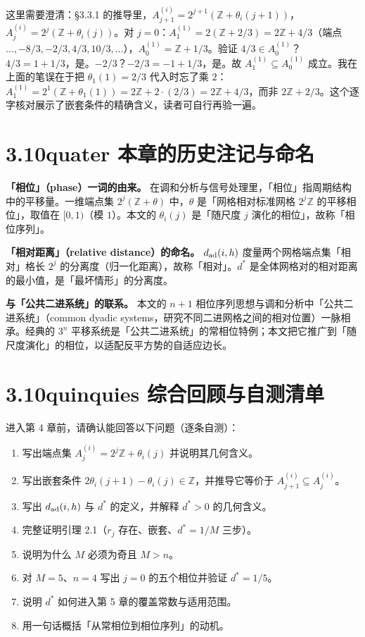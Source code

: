 \documentclass[a4paper,11pt,openany]{ctexbook}
\numberwithin{equation}{chapter}
\numberwithin{figure}{chapter}
\numberwithin{table}{chapter}
\begin{document}
这里需要澄清：§3.3.1 的推导里，$A_{j+1}^{(i)}=2^{j+1}(\mathbb Z+\theta_i(j+1))$，$A_j^{(i)}=2^j(\mathbb Z+\theta_i(j))$。对 $j=0$：$A_1^{(1)}=2(\mathbb Z+2/3)=2\mathbb Z+4/3$（端点 $\dots,-8/3,-2/3,4/3,10/3,\dots$），$A_0^{(1)}=\mathbb Z+1/3$。验证 $4/3\in A_0^{(1)}$？$4/3=1+1/3$，是。$-2/3$？$-2/3=-1+1/3$，是。故 $A_1^{(1)}\subseteq A_0^{(1)}$ 成立。我在上面的笔误在于把 $\theta_1(1)=2/3$ 代入时忘了乘 $2$：$A_1^{(1)}=2^1(\mathbb Z+\theta_1(1))=2\mathbb Z+2\cdot(2/3)=2\mathbb Z+4/3$，而非 $2\mathbb Z+2/3$。这个逐字核对展示了嵌套条件的精确含义，读者可自行再验一遍。

\section{3.10quater 本章的历史注记与命名}

\textbf{「相位」（phase）一词的由来。} 在调和分析与信号处理里，「相位」指周期结构中的平移量。一维端点集 $2^j(\mathbb Z+\theta)$ 中，$\theta$ 是「网格相对标准网格 $2^j\mathbb Z$ 的平移相位」，取值在 $[0,1)$（模 $1$）。本文的 $\theta_i(j)$ 是「随尺度 $j$ 演化的相位」，故称「相位序列」。

\textbf{「相对距离」（relative distance）的命名。} $d_{\rm ad}(i,h)$ 度量两个网格端点集「相对」格长 $2^j$ 的分离度（归一化距离），故称「相对」。$d^*$ 是全体网格对的相对距离的最小值，是「最坏情形」的分离度。

\textbf{与「公共二进系统」的联系。} 本文的 $n+1$ 相位序列思想与调和分析中「公共二进系统」（common dyadic systems，研究不同二进网格之间的相对位置）一脉相承。经典的 $3^n$ 平移系统是「公共二进系统」的常相位特例；本文把它推广到「随尺度演化」的相位，以适配反平方势的自适应边长。

\section{3.10quinquies 综合回顾与自测清单}

进入第 4 章前，请确认能回答以下问题（逐条自测）：

\begin{enumerate}
\item 写出端点集 $A_j^{(i)}=2^j\mathbb Z+\theta_i(j)$ 并说明其几何含义。
\item 写出嵌套条件 $2\theta_i(j+1)-\theta_i(j)\in\mathbb Z$，并推导它等价于 $A_{j+1}^{(i)}\subseteq A_j^{(i)}$。
\item 写出 $d_{\rm ad}(i,h)$ 与 $d^*$ 的定义，并解释 $d^*>0$ 的几何含义。
\item 完整证明引理 2.1（$r_j$ 存在、嵌套、$d^*=1/M$ 三步）。
\item 说明为什么 $M$ 必须为奇且 $M>n$。
\item 对 $M=5$、$n=4$ 写出 $j=0$ 的五个相位并验证 $d^*=1/5$。
\item 说明 $d^*$ 如何进入第 5 章的覆盖常数与适用范围。
\item 用一句话概括「从常相位到相位序列」的动机。
\end{enumerate}
\end{document}
